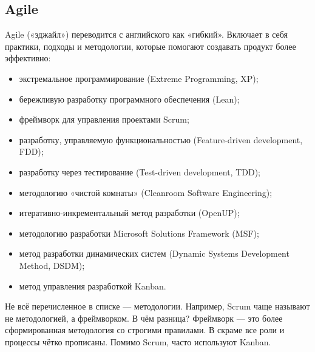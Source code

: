 \documentclass[a4paper]{article}
\begin{document}
\subsection{Agile}

Agile («эджайл») переводится с английского как «гибкий». Включает в себя практики, подходы и методологии, которые помогают создавать продукт более эффективно:

\begin{itemize}
    \item экстремальное программирование (Extreme Programming, XP);
    \item бережливую разработку программного обеспечения (Lean);
    \item фреймворк для управления проектами Scrum;
    \item разработку, управляемую функциональностью (Feature-driven development, FDD);
    \item разработку через тестирование (Test-driven development, TDD);
    \item методологию «чистой комнаты» (Cleanroom Software Engineering);
    \item итеративно-инкрементальный метод разработки (OpenUP);
    \item методологию разработки Microsoft Solutions Framework (MSF);
    \item метод разработки динамических систем (Dynamic Systems Development Method, DSDM);
    \item метод управления разработкой Kanban.
\end{itemize}

Не всё перечисленное в списке — методологии. Например, Scrum чаще называют не методологией, а фреймворком. В чём разница? Фреймворк — это более сформированная методология со строгими правилами. В скраме все роли и процессы чётко прописаны. Помимо Scrum, часто используют Kanban.
\end{document}
